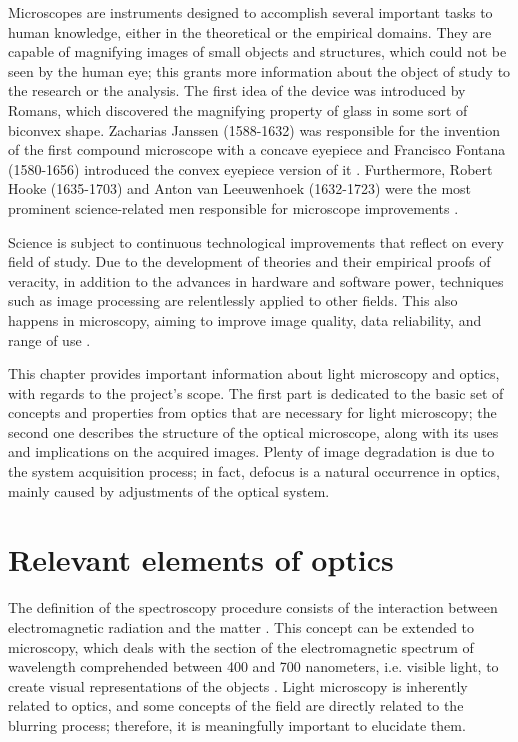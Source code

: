 Microscopes are instruments designed to accomplish several important tasks to human knowledge, either in the theoretical or the empirical domains. They are capable of magnifying images of small objects and structures, which could not be seen by the human eye; this grants more information about the object of study to the research or the analysis. The first idea of the device was introduced by Romans, which discovered the magnifying property of glass in some sort of biconvex shape. Zacharias Janssen (1588-1632) was responsible for the invention of the first compound microscope with a concave eyepiece and  Francisco Fontana (1580-1656) introduced the convex eyepiece version of it \cite{zilio2009optica}. Furthermore, Robert Hooke (1635-1703) and Anton van Leeuwenhoek (1632-1723) were the most prominent science-related men responsible for microscope improvements \cite{wu2008microscope}.

Science is subject to continuous technological improvements that reflect on every field of study. Due to the development of theories and their empirical proofs of veracity, in addition to the advances in hardware and software power, techniques such as image processing are relentlessly applied to other fields. This also happens in microscopy, aiming to improve image quality, data reliability, and range of use \cite{boyde1990modern}.

This chapter provides important information about light microscopy and optics, with regards to the project's scope. The first part is dedicated to the basic set of concepts and properties from optics that are necessary for light microscopy; the second one describes the structure of the optical microscope, along with its uses and implications on the acquired images. Plenty of image degradation is due to the system acquisition process; in fact, defocus is a natural occurrence in optics, mainly caused by adjustments of the optical system.

\section{Relevant elements of optics}

The definition of the spectroscopy procedure consists of the interaction between electromagnetic radiation and the matter \cite{gauglitz2006handbook}. This concept can be extended to microscopy, which deals with the section of the electromagnetic spectrum of wavelength comprehended between 400 and 700 nanometers, i.e. visible light,  to create visual representations of the objects
\cite{bell2009introduction}. Light microscopy is inherently related to optics, and some concepts of the field are directly related to the blurring process; therefore, it is meaningfully important to elucidate them.

